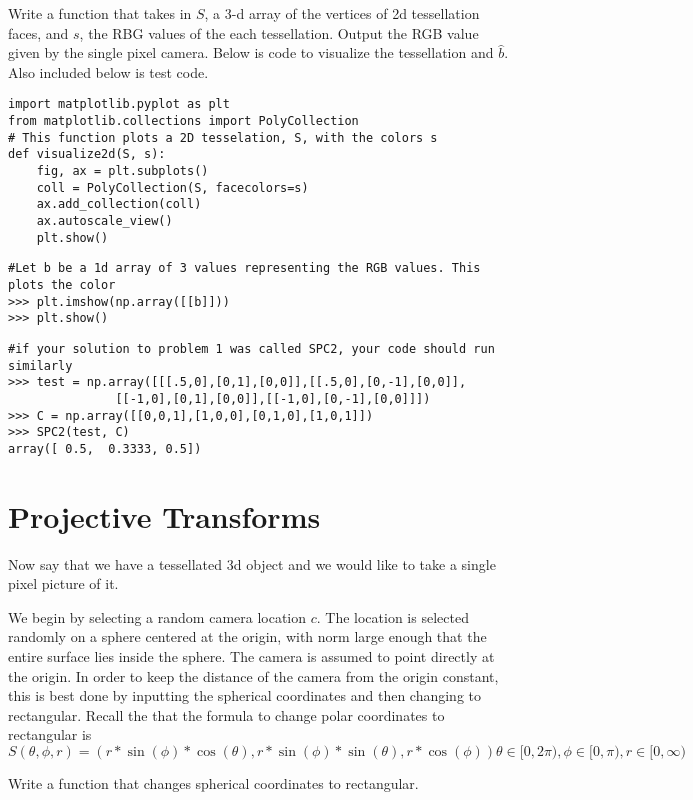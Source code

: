 \begin{problem}
Write a function that takes in $S$, a 3-d array of the vertices of 2d tessellation faces, and $s$, the RBG values of the each tessellation. 
Output the RGB value given by the single pixel camera. 
Below is code to visualize the tessellation and $\hat{b}$.  
Also included below is test code.
\begin{lstlisting}
import matplotlib.pyplot as plt
from matplotlib.collections import PolyCollection
# This function plots a 2D tesselation, S, with the colors s 
def visualize2d(S, s):
    fig, ax = plt.subplots()
    coll = PolyCollection(S, facecolors=s)
    ax.add_collection(coll)
    ax.autoscale_view()
    plt.show()
\end{lstlisting}
\begin{lstlisting}
#Let b be a 1d array of 3 values representing the RGB values. This plots the color
>>> plt.imshow(np.array([[b]]))
>>> plt.show()
\end{lstlisting}
\begin{lstlisting}
#if your solution to problem 1 was called SPC2, your code should run similarly
>>> test = np.array([[[.5,0],[0,1],[0,0]],[[.5,0],[0,-1],[0,0]],
               [[-1,0],[0,1],[0,0]],[[-1,0],[0,-1],[0,0]]])
>>> C = np.array([[0,0,1],[1,0,0],[0,1,0],[1,0,1]])
>>> SPC2(test, C)
array([ 0.5,  0.3333, 0.5])
\end{lstlisting}
\end{problem}

\section*{Projective Transforms}
Now say that we have a tessellated 3d object and we would like to take a single pixel picture of it.

We begin by selecting a random camera location $c$. 
The location is selected randomly on a sphere centered at the origin, with norm large enough that the entire surface lies inside the sphere. 
The camera is assumed to point directly at the origin.
In order to keep the distance of the camera from the origin constant, this is best done by inputting the spherical coordinates and then changing to rectangular.
Recall the that the formula to change polar coordinates to rectangular is 
\[
S(\theta,\phi,r)=(r*\sin(\phi)*\cos(\theta),r*\sin(\phi)*\sin(\theta),r*\cos(\phi))
\theta \in [0,2\pi),\phi \in [0,\pi), r \in [0,\infty)
\]
\begin{problem}
Write a function that changes spherical coordinates to rectangular.
\end{problem}

